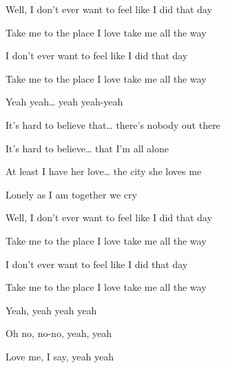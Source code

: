 \begin{song}
\bigskip

Well, I don't ever want to feel  like I did that day \par
{}Take me to the place I love  take me all the way \par
{}I don't ever want to feel  like I did that day \par
{}Take me to the place I love  take me all the way \par
{}Yeah yeah…  yeah yeah-yeah \par
{}    \par

\bigskip

It's hard to believe that… there's nobody out there \par
It's hard to believe… that I'm all alone \par
At least I have her love… the city she loves me \par
{}Lonely as I am together we cry \par
{} \par

\bigskip

Well, I don't ever want to feel  like I did that day \par
{}Take me to the place I love  take me all the way \par
{}I don't ever want to feel  like I did that day \par
{}Take me to the place I love  take me all the way \par
{}Yeah, yeah  yeah yeah \par
{}Oh no, no-no, yeah, yeah \par
{}Love me, I say, yeah yeah \par

\bigskip

   \par


\end{song}
